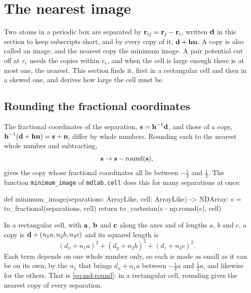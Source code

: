 \section{The nearest image}
\label{sec:md-image}

Two atoms in a periodic box are separated by $\bm{\mathrm{r}}_{ij} = \bm{\mathrm{r}}_j -
\bm{\mathrm{r}}_i$, written $\bm{\mathrm{d}}$ in this section to keep subscripts short, and
by every copy of it, $\bm{\mathrm{d}} + \bm{\mathrm{h}}\bm{\mathrm{n}}$. A copy is also called an
image, and the nearest copy the minimum image. A pair
potential cut off at $r_{\mathrm c}$ needs the copies within $r_{\mathrm c}$,
and when the cell is large enough there is at most one, the nearest. This
section finds it, first in a rectangular cell and then in a skewed one,
and derives how large the cell must be.

\subsection*{Rounding the fractional coordinates}

The fractional coordinates of the separation, $\bm{\mathrm{s}} = \bm{\mathrm{h}}^{-1}\bm{\mathrm{d}}$,
and those of a copy, $\bm{\mathrm{h}}^{-1}(\bm{\mathrm{d}} + \bm{\mathrm{h}}\bm{\mathrm{n}}) = \bm{\mathrm{s}} +
\bm{\mathrm{n}}$, differ by whole numbers. Rounding
each to the nearest whole number and subtracting,
\begin{equation}
   \bm{\mathrm{s}} \to \bm{\mathrm{s}} - \operatorname{round}(\bm{\mathrm{s}}) ,
   \label{eq:md-round}
\end{equation}
gives the copy whose fractional coordinates all lie between $-\frac12$
and $\frac12$. The function \texttt{minimum\_image} of \texttt{mdlab.cell}
does this for many separations at once:

\begin{code}
def minimum_image(separations: ArrayLike, cell: ArrayLike) -> NDArray:
    s = to_fractional(separations, cell)
    return to_cartesian(s - np.round(s), cell)
\end{code}

In a rectangular cell, with $\bm{\mathrm{a}}$, $\bm{\mathrm{b}}$ and $\bm{\mathrm{c}}$ along the
axes and of lengths $a$, $b$ and $c$, a copy is $\bm{\mathrm{d}} + (n_1a, n_2b,
n_3c)$ and its squared length is
\begin{equation*}
   (d_x + n_1a)^2 + (d_y + n_2b)^2 + (d_z + n_3c)^2 .
\end{equation*}
Each term depends on one whole number only, so each is made as small as it
can be on its own, by the $n_1$ that brings $d_x + n_1a$ between
$-\frac12a$ and $\frac12a$, and likewise for the others. That is
\cref{eq:md-round}: in a rectangular cell, rounding gives the nearest copy
of every separation.


